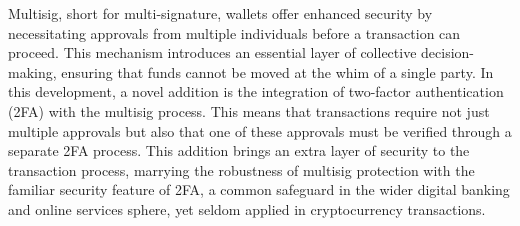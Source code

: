 \documentclass[12pt]{report}
\begin{document}
\par Multisig, short for multi-signature, wallets offer enhanced security by necessitating approvals from multiple individuals before a transaction can proceed. This mechanism introduces an essential layer of collective decision-making, ensuring that funds cannot be moved at the whim of a single party. In this development, a novel addition is the integration of two-factor authentication (2FA) with the multisig process. This means that transactions require not just multiple approvals but also that one of these approvals must be verified through a separate 2FA process. This addition brings an extra layer of security to the transaction process, marrying the robustness of multisig protection with the familiar security feature of 2FA, a common safeguard in the wider digital banking and online services sphere, yet seldom applied in cryptocurrency transactions.
























\tableofcontents


\newpage
{}










\end{document}
